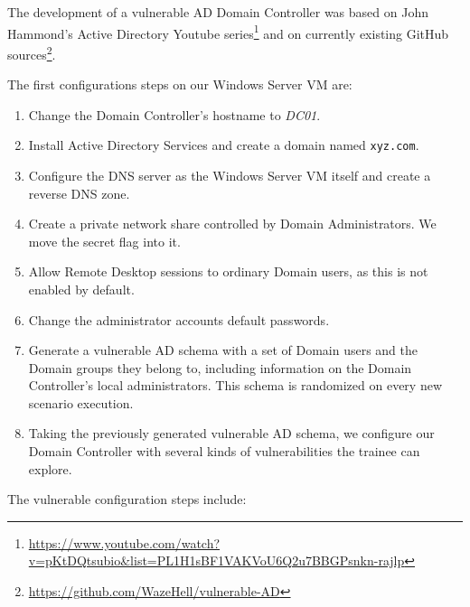 The development of a vulnerable AD Domain Controller was based on John Hammond's Active Directory Youtube series\footnote{\url{https://www.youtube.com/watch?v=pKtDQtsubio&list=PL1H1sBF1VAKVoU6Q2u7BBGPsnkn-rajlp}} and on currently existing GitHub sources\footnote{\url{https://github.com/WazeHell/vulnerable-AD}}.


The first configurations steps on our Windows Server VM are:

\begin{enumerate}
    \item Change the Domain Controller's hostname to \textit{DC01}.
    \item Install Active Directory Services and create a domain named \texttt{xyz.com}.
    \item Configure the DNS server as the Windows Server VM itself and create a reverse DNS zone.
    \item Create a private network share controlled by Domain Administrators. We move the secret flag into it.
    \item Allow Remote Desktop sessions to ordinary Domain users, as this is not enabled by default.
    \item Change the administrator accounts default passwords.
    \item Generate a vulnerable AD schema with a set of Domain users and the Domain groups they belong to, including information on the Domain Controller's local administrators. This schema is randomized on every new scenario execution.
    \item Taking the previously generated vulnerable AD schema, we configure our Domain Controller with several kinds of vulnerabilities the trainee can explore.
\end{enumerate}

The vulnerable configuration steps include:

